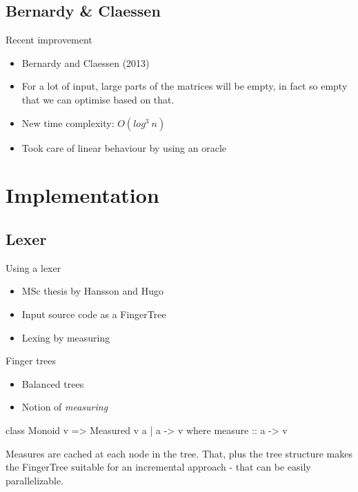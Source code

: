 \documentclass{beamer}
\begin{document}
\subsection{Bernardy \& Claessen}
\begin{frame}{Recent improvement}
    \begin{itemize}
        \item Bernardy and Claessen (2013)
        \item For a lot of input, large parts of the matrices will be empty, in
              fact so empty that we can optimise based on that.
        \item New time complexity: $O(log^3\ n)$
        \item Took care of linear behaviour by using an oracle
    \end{itemize}
\end{frame}

\section{Implementation}

\subsection{Lexer}
\begin{frame}{Using a lexer}
    \begin{itemize}
        \item MSc thesis by Hansson and Hugo
        \item Input source code as a FingerTree
        \item Lexing by measuring
    \end{itemize}
\end{frame}

\begin{frame}[fragile]{Finger trees}
    \begin{itemize}
        \item Balanced trees
        \item Notion of \textit{measuring}
    \end{itemize}

    \begin{code}
    class Monoid v => Measured v a | a -> v where
        measure :: a -> v
    \end{code}

    Measures are cached at each node in the tree. That, plus the tree structure
    makes the FingerTree suitable for an incremental approach - that can be
    easily parallelizable.
\end{frame}
\end{document}
